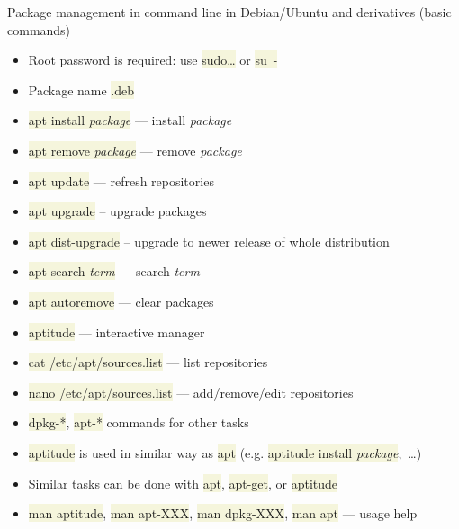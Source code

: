 \documentclass[compress, ucs, xelatex, 11pt, xcolor=svgnames, aspectratio=169,
	hyperref={
		bookmarks=true,
		unicode=true,
		colorlinks=true,
		pdftitle={Linux, command line and MetaCentrum},
		plainpages=false,
		pdfauthor={Vojtech Zeisek},
		pdfsubject={Course about use of Linux command line, writing shell scripts and using MetaCentrum of CESNET},
		pdfcreator={XeLaTeX},
		pdfkeywords={Linux, GNU, BASH, shell, command line, MetaCentrum},
		linkcolor=DarkRed, %
		anchorcolor=DarkBlue, %
		citecolor=Indigo, %
		filecolor=NavyBlue, %
		menucolor=DarkMagenta, %
		urlcolor=DarkBlue, %
		pdftex},
	url={hyphens, lowtilde} %
	]{beamer}
\renewcommand{\texttt}[1]{\colorbox{Beige}{{\ttfamily #1}}}
\begin{document}
\begin{frame}[allowframebreaks]{Package management in command line in Debian/Ubuntu and derivatives (basic commands)}
	\begin{itemize}
		\item Root password is required: use \texttt{sudo\ldots} or \texttt{su~-}
		\item Package name \texttt{*.deb}
		\item \texttt{apt install \textit{package}} --- install \textit{package}
		\item \texttt{apt remove \textit{package}} --- remove \textit{package}
		\item \texttt{apt update} --- refresh repositories
		\item \texttt{apt upgrade} -- upgrade packages
		\item \texttt{apt dist-upgrade} -- upgrade to newer release of whole distribution
		\item \texttt{apt search \textit{term}} --- search \textit{term}
		\item \texttt{apt autoremove} --- clear packages
		\item \texttt{aptitude} --- interactive manager
		\item \texttt{cat /etc/apt/sources.list} --- list repositories
		\item \texttt{nano /etc/apt/sources.list} --- add/remove/edit repositories
		\item \texttt{dpkg-*}, \texttt{apt-*} commands for other tasks
		\item \texttt{aptitude} is used in similar way as \texttt{apt} (e.g. \texttt{aptitude install \textit{package}},~\ldots)
		\item Similar tasks can be done with \texttt{apt}, \texttt{apt-get}, or \texttt{aptitude}
		\item \texttt{man aptitude}, \texttt{man apt-XXX}, \texttt{man dpkg-XXX}, \texttt{man apt} --- usage help
	\end{itemize}
\end{frame}
\end{document}
